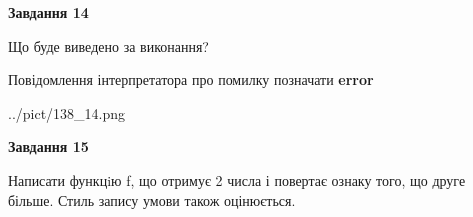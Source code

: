 \documentclass[11pt, ukrainian]{article}
\begin{document}
{\begin {large}
{\begin {center}\textbf{Завдання 14}\end {center}}\par
Що буде виведено за виконання? \par
Повідомлення інтерпретатора про помилку позначати \textbf{error}

\begin{center}
	{../pict/138_14.png}
\end{center}
\newpage

{\begin {center}\textbf{Завдання 15}\end {center}}\par

Написати функцiю f, що отримує 2 числа і повертає ознаку того, що друге більше. Стиль запису умови також оцінюється.\par
\newpage

\end {large}}
\end{document}
